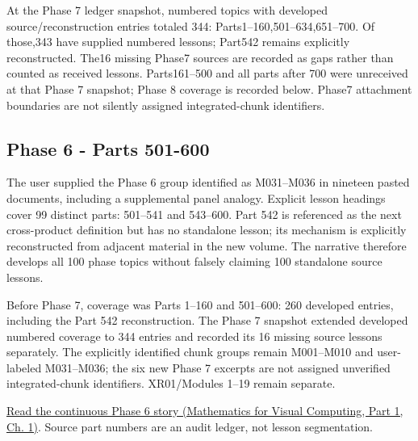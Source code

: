 At the Phase 7 ledger snapshot, numbered topics with developed source/reconstruction entries totaled 344: Parts1--160,501--634,651--700. Of those,343 have supplied numbered lessons; Part542 remains explicitly reconstructed. The16 missing Phase7 sources are recorded as gaps rather than counted as received lessons. Parts161--500 and all parts after 700 were unreceived at that Phase 7 snapshot; Phase 8 coverage is recorded below. Phase7 attachment boundaries are not silently assigned integrated-chunk identifiers.

\subsection{Phase 6 - Parts 501-600}\label{appendix-fd090d982a15-phase-6---parts-501-600}

\hypertarget{appendix-fd090d982a15-phase-6---parts-501-600}{}

The user supplied the Phase 6 group identified as M031--M036 in nineteen pasted documents, including a supplemental panel analogy. Explicit lesson headings cover 99 distinct parts: 501--541 and 543--600. Part 542 is referenced as the next cross-product definition but has no standalone lesson; its mechanism is explicitly reconstructed from adjacent material in the new volume. The narrative therefore develops all 100 phase topics without falsely claiming 100 standalone source lessons.

Before Phase 7, coverage was Parts 1--160 and 501--600: 260 developed entries, including the Part 542 reconstruction. The Phase 7 snapshot extended developed numbered coverage to 344 entries and recorded its 16 missing source lessons separately. The explicitly identified chunk groups remain M001--M010 and user-labeled M031--M036; the six new Phase 7 excerpts are not assigned unverified integrated-chunk identifiers. XR01/Modules 1--19 remain separate.

\href{../02-Mathematics-for-Visual-Computing-P01/main.pdf\#nameddest=01-foundations-i-ch017-the-panel-gives-us-a-reason-to-learn}{Read the continuous Phase 6 story (Mathematics for Visual Computing, Part 1, Ch. 1)}. Source part numbers are an audit ledger, not lesson segmentation.

